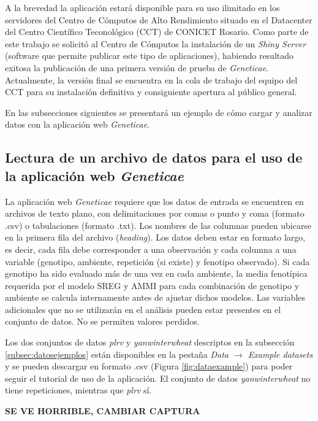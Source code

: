 A la brevedad la aplicación estará disponible para su uso ilimitado en los servidores del Centro de Cómputos de Alto Rendimiento situado en el Datacenter del Centro Científico Teconológico (CCT) de CONICET Rosario.  Como parte de este trabajo se solicitó al Centro de Cómputos la instalación de un \emph{Shiny Server}  (software que permite publicar este tipo de aplicaciones), habiendo resultado exitosa la publicación de una primera versión de prueba de \emph{Geneticae}. Actualmente, la versión final se encuentra en la cola de trabajo del equipo del CCT para su instalación definitiva y consiguiente apertura al público general.


En las subsecciones siguientes se presentará un ejemplo de cómo cargar y analizar datos con la aplicación web \emph{Geneticae}.


\subsection{Lectura de un archivo de datos para el uso de la aplicación web \emph{Geneticae}}

La aplicación web \emph{Geneticae} requiere que los datos de entrada se encuentren en archivos de texto plano, con delimitaciones por comas o punto y coma (formato .csv) o tabulaciones (formato .txt). Los nombres de las columnas pueden ubicarse en la primera fila del archivo (\emph{heading}). Los datos deben estar en formato largo, es decir, cada fila debe corresponder a una observación y cada columna a una variable (genotipo, ambiente, repetición (si existe) y fenotipo observado). Si cada genotipo ha sido evaluado más de una vez en cada ambiente, la media fenotípica requerida por el modelo SREG y AMMI para cada combinación de genotipo y ambiente se calcula internamente antes de ajustar dichos modelos. Las variables adicionales que no se utilizarán en el análisis pueden estar presentes en el conjunto de datos. No se permiten valores perdidos.

Los dos conjuntos de datos \emph{plrv} y \emph{yanwinterwheat} descriptos en la subsección \ref{subsec:datosejemplos} están disponibles en la pestaña \emph{Data $\rightarrow$ Example datasets} y se pueden descargar en formato .csv (Figura \ref{fig:dataexample}) para poder seguir el tutorial de uso de la aplicación. El conjunto de datos \emph{yanwinterwheat} no tiene repeticiones, mientras que \emph{plrv} sí. 

\textbf{SE VE HORRIBLE, CAMBIAR CAPTURA}

